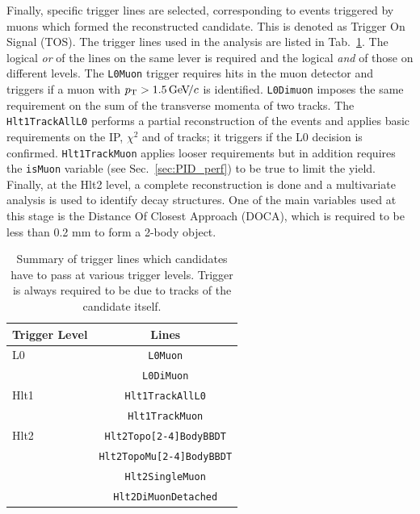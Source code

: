 Finally, specific trigger lines are selected, corresponding to events triggered by muons
which formed the reconstructed candidate. This is denoted as Trigger On Signal (TOS).
The trigger lines used in the analysis are listed in Tab.~\ref{tab:Lb_triggerLines}.
The logical {\em or } of the lines on the same lever is required and the logical {\em and }
of those on different levels.
The \verb!L0Muon! trigger requires hits in the muon detector and triggers if a muon with $\mbox{$p_{\rm T}$} > 1.5 {\mathrm{\,Ge\kern -0.1em V\!/}c}$ is identified.
\verb!L0Dimuon! imposes the same requirement on the sum of the transverse momenta of two tracks.
The \verb!Hlt1TrackAllL0! performs a partial reconstruction of the events and applies basic requirements on the
IP, $\chi^2$ and \pt of tracks; it triggers if the L0 decision is confirmed. \verb!Hlt1TrackMuon! applies looser requirements 
but in addition requires the \verb!isMuon! variable (see Sec.~\ref{sec:PID_perf}) to be true to limit the yield.
Finally, at the Hlt2 level, a complete reconstruction is done and a multivariate analysis is used to identify decay 
structures. One of the main variables used at this stage is the Distance Of Closest Approach (DOCA), which is 
required to be less than 0.2 mm to form a 2-body object.
%
\begin{table}[h]
\centering
\caption{Summary of trigger lines which candidates have to pass at various trigger levels.
Trigger is always required to be due to tracks of the candidate itself.}
\begin{tabular}{lc} \hline
Trigger Level &  Lines   \\ \hline
L0            & \verb!L0Muon!  \\
                & \verb!L0DiMuon! \\ \hline
Hlt1         & \verb!Hlt1TrackAllL0! \\ 
               & \verb!Hlt1TrackMuon!      \\ \hline
Hlt2        & \verb!Hlt2Topo[2-4]BodyBBDT!  \\
              & \verb!Hlt2TopoMu[2-4]BodyBBDT!\\
              & \verb!Hlt2SingleMuon!     \\
              & \verb!Hlt2DiMuonDetached! \\ \hline
\end{tabular}
\label{tab:Lb_triggerLines}
\end{table}
%


